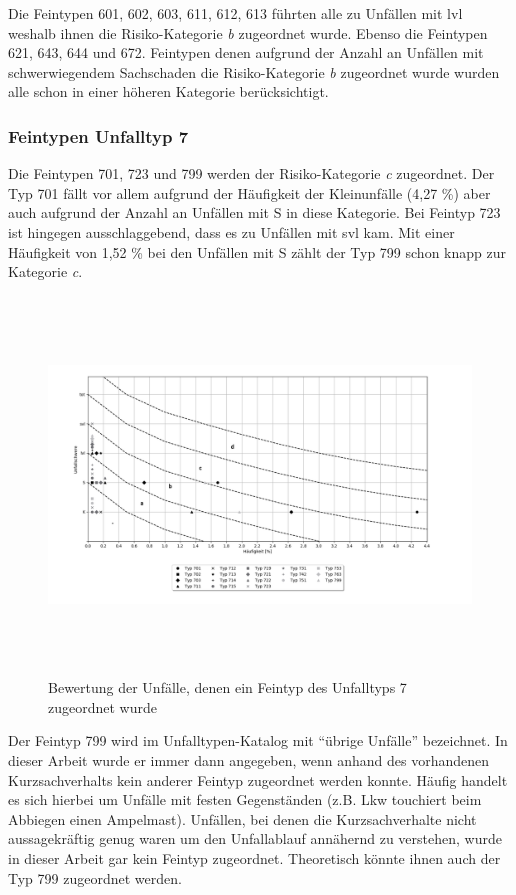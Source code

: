 Die Feintypen 601, 602, 603, 611, 612, 613 führten alle zu Unfällen mit \ac{lvl} weshalb ihnen die Risiko-Kategorie \textit{b} zugeordnet wurde. Ebenso die Feintypen 621, 643, 644 und 672. Feintypen denen aufgrund der Anzahl an Unfällen mit schwerwiegendem Sachschaden die Risiko-Kategorie \textit{b} zugeordnet wurde wurden alle schon in einer höheren Kategorie berücksichtigt.   

\subsubsection{Feintypen Unfalltyp 7}
Die Feintypen 701, 723 und 799 werden der Risiko-Kategorie \textit{c} zugeordnet. Der Typ 701 fällt vor allem aufgrund der Häufigkeit der Kleinunfälle (4,27 \%) aber auch aufgrund der Anzahl an Unfällen mit \ac{S} in diese Kategorie. Bei Feintyp 723 ist hingegen ausschlaggebend, dass es zu Unfällen mit \ac{svl} kam. Mit einer Häufigkeit von 1,52 \% bei den Unfällen mit \ac{S} zählt der Typ 799 schon knapp zur Kategorie \textit{c}.

\begin{savenotes}
	\begin{figure}[H]
		\centering
		\includegraphics[width=18cm,height=10cm]{figures/Bewertung_FT7}
		\caption[Bewertung der Unfälle, denen ein Feintyp des Unfalltyps 7 zugeordnet wurde]{Bewertung der Unfälle, denen ein Feintyp des Unfalltyps 7 zugeordnet wurde}\label{fig:Bewertung_FT7}
	\end{figure}
\end{savenotes}

Der Feintyp 799 wird im Unfalltypen-Katalog mit \enquote{übrige Unfälle} bezeichnet. In dieser Arbeit wurde er immer dann angegeben, wenn anhand des vorhandenen Kurzsachverhalts kein anderer Feintyp zugeordnet werden konnte. Häufig handelt es sich hierbei um Unfälle mit festen Gegenständen (z.B. Lkw touchiert beim Abbiegen einen Ampelmast). Unfällen, bei denen die Kurzsachverhalte nicht aussagekräftig genug waren um den Unfallablauf annähernd zu verstehen, wurde in dieser Arbeit gar kein Feintyp zugeordnet. Theoretisch könnte ihnen auch der Typ 799 zugeordnet werden.   

